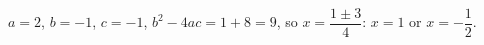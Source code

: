 $a=2$, $b=-1$, $c=-1$, $b^2-4ac=1+8=9$, so $x=\dfrac{1\pm3}{4}$: $x=\boxed{1}$ or $x=\boxed{-\dfrac12}$.
